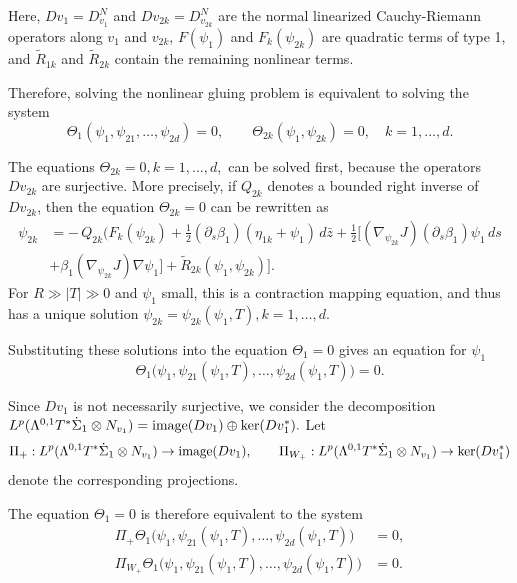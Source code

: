 \documentclass{amsart}
\begin{document}
Here, $Dv_1=D_{v_1}^N$ and $Dv_{2k}=D_{v_{2k}}^N$ are the normal linearized Cauchy-Riemann operators
along $v_1$ and $v_{2k}$, $F(\psi_1)$ and $F_k(\psi_{2k})$ are quadratic terms of type 1,
and $\widetilde R_{1k}$ and $\widetilde R_{2k}$ contain the remaining nonlinear
terms.


Therefore, solving the nonlinear gluing problem is equivalent to solving the
system
\[
\Theta_1(\psi_1,\psi_{21},\dots,\psi_{2d})=0,
\qquad
\Theta_{2k}(\psi_1,\psi_{2k})=0,\quad k=1,\dots,d.
\]

The equations $\Theta_{2k}=0, k=1,\ldots, d,$
can be solved first, because the operators $Dv_{2k}$ are surjective.  More precisely, if $Q_{2k}$ denotes a bounded right inverse of
$Dv_{2k}$, then the equation $\Theta_{2k}=0$ can be rewritten as
$$
\begin{aligned}\psi_{2k}
& =
-\,Q_{2k}\Big(
F_k(\psi_{2k})
+\frac12(\partial_s\beta_1)(\eta_{1k}+\psi_1)\,d\bar z
+\frac12\big[(\nabla_{\psi_{2k}}J)(\partial_s\beta_1)\psi_1\,ds\\ &
+\beta_1(\nabla_{\psi_{2k}}J)\nabla\psi_1\big]
+\widetilde R_{2k}(\psi_1,\psi_{2k})
\Big].
\end{aligned}$$
For $R\gg |T|\gg 0$ and $\psi_1$ small, this is a contraction mapping equation,
and thus has a unique solution
$
\psi_{2k}=\psi_{2k}(\psi_1,T), k=1,\dots,d.
$

Substituting these solutions into the equation $\Theta_1=0$ gives an equation
for $\psi_1$
$$
\Theta_1\bigl(\psi_1,\psi_{21}(\psi_1,T),\dots,\psi_{2d}(\psi_1,T)\bigr)=0.
$$

Since $Dv_1$ is not necessarily surjective, we consider the decomposition 
$
L^p(\Lambda^{0,1}T^*\dot\Sigma_1\otimes N_{v_1})={\rm image}(Dv_1)\oplus \ker(Dv_1^*).
$ 
Let
$$
\Pi_+:L^p(\Lambda^{0,1}T^*\dot\Sigma_1\otimes N_{v_1})\to {\rm image}(Dv_1),
\qquad
\Pi_{W_+}:L^p(\Lambda^{0,1}T^*\dot\Sigma_1\otimes N_{v_1})\to \ker(Dv_1^*)
$$
denote the corresponding projections.

The equation $\Theta_1=0$ is therefore equivalent to the system
\begin{align}
\Pi_+\Theta_1\bigl(\psi_1,\psi_{21}(\psi_1,T),\dots,\psi_{2d}(\psi_1,T)\bigr)&=0,
\label{eq:proj-image}\\
\Pi_{W_+}\Theta_1\bigl(\psi_1,\psi_{21}(\psi_1,T),\dots,\psi_{2d}(\psi_1,T)\bigr)&=0.
\label{eq:proj-cokernel}
\end{align}
\end{document}
